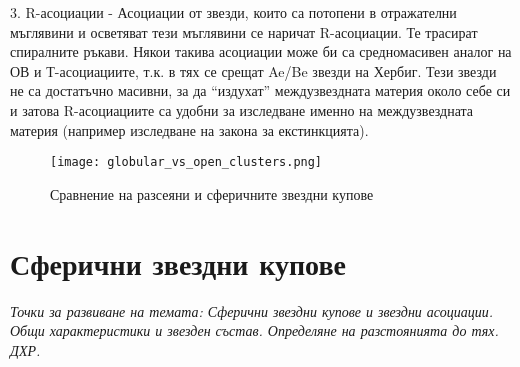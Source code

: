 \documentclass[a4paper,12pt]{article}
\begin{document}
3. R-асоциации - Асоциации от звезди, които са потопени в отражателни мъглявини и осветяват тези мъглявини се наричат R-асоциации. Те трасират спиралните ръкави. Някои такива асоциации може би са средномасивен аналог на ОВ и Т-асоциациите, т.к. в тях се срещат Ae/Be звезди на Хербиг. Тези звезди не са достатъчно масивни, за да “издухат” междузвездната материя около себе си и затова R-асоциациите са удобни за изследване именно на междузвездната материя (например изследване на закона за екстинкцията).

\begin{figure}[h!]
\centering
\texttt{[image: globular\_vs\_open\_clusters.png]}
\caption{Сравнение на разсеяни и сферичните звездни купове}
\label{fig:globular_vs_open_clusters}
\end{figure}


\section{Сферични звездни купове}
\textit{Точки за развиване на темата: Сферични звездни купове и звездни асоциации. Общи характеристики и звезден състав.
Определяне на разстоянията до тях. ДХР.}\\
\end{document}

